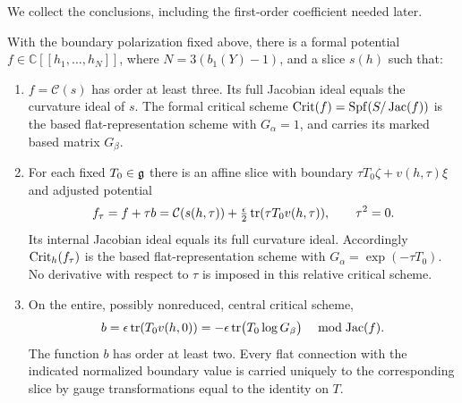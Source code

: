 We collect the conclusions, including the first-order coefficient
needed later.

\begin{proposition}
\label{prop:edge-potential}
With the boundary polarization fixed above, there is a formal potential
$f\in\mathbb C[[h_1,\ldots,h_N]]$, where
$N=3(b_1(Y)-1)$, and a slice $s(h)$ such that:
\begin{enumerate}[label=\textup{(\roman*)}]
 \item $f=\mathcal C(s)$ has order at least three.  Its full Jacobian
 ideal equals the curvature ideal of $s$.  The formal critical scheme
 $\operatorname{Crit}(f)=\operatorname{Spf}(S/\operatorname{Jac}(f))$ is the based flat-representation scheme
 with $G_\alpha=1$, and carries its marked based matrix $G_\beta$.
 \item For each fixed $T_0\in\mathfrak{g}$ there is an affine slice with boundary
 $\tau T_0\zeta+v(h,\tau)\xi$ and adjusted potential
 \[
  f_\tau=f+\tau b
    =\mathcal C(s(h,\tau))
             +\tfrac{\epsilon}{2}\operatorname{tr}(\tau T_0v(h,\tau)),
  \qquad \tau^2=0.
 \]
 Its internal Jacobian ideal equals its full curvature ideal.
 Accordingly $\operatorname{Crit}_h(f_\tau)$ is the based flat-representation scheme
 with $G_\alpha=\exp(-\tau T_0)$.  No derivative with respect to
 $\tau$ is imposed in this relative critical scheme.
 \item On the entire, possibly nonreduced, central critical scheme,
 \begin{equation}
 \label{eq:edge-log-coefficient}
  b=\epsilon\operatorname{tr}(T_0v(h,0))
      =-\epsilon\operatorname{tr}\bigl(T_0\log G_\beta\bigr)
       \quad\bmod\operatorname{Jac}(f).
 \end{equation}
 The function $b$ has order at least two.  Every flat connection with
 the indicated normalized boundary value is carried uniquely to the
 corresponding slice by gauge transformations equal to the identity
 on $T$.
\end{enumerate}
\end{proposition}

